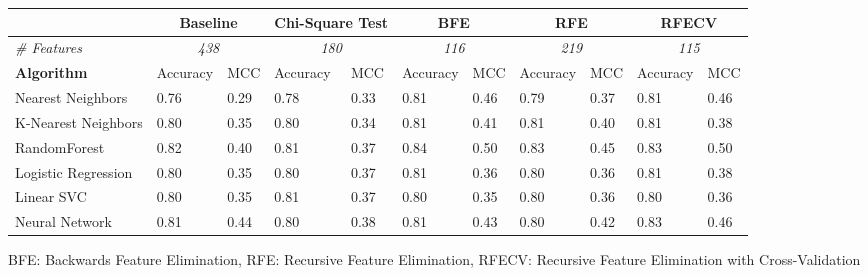 \begin{tabular}{l|ll|ll|ll|ll|ll}
& \multicolumn{2}{c|}{\textbf{Baseline}} & \multicolumn{2}{c|}{\textbf{Chi-Square Test}}  & \multicolumn{2}{c|}{\textbf{BFE}} & \multicolumn{2}{c|}{\textbf{RFE}}    & \multicolumn{2}{c}{\textbf{RFECV}} \\
\toprule
\textit{\# Features}& \multicolumn{2}{c|}{\textit{438}} & \multicolumn{2}{c|}{\textit{180}}  & \multicolumn{2}{c|}{\textit{116}} & \multicolumn{2}{c|}{\textit{219}}    & \multicolumn{2}{c}{\textit{115}} \\
\midrule
\textbf{Algorithm}      & Accuracy  & MCC   & Accuracy  & MCC   & Accuracy  & MCC   & Accuracy  & MCC   & Accuracy  & MCC \\
\midrule                       
Nearest Neighbors       & 0.76      & 0.29  & 0.78      & 0.33  & 0.81      & 0.46  & 0.79      & 0.37  & 0.81      & 0.46 \\
K-Nearest Neighbors     & 0.80      & 0.35  & 0.80      & 0.34  & 0.81      & 0.41  & 0.81      & 0.40  & 0.81      & 0.38 \\
RandomForest            & 0.82      & 0.40  & 0.81      & 0.37  & 0.84      & 0.50  & 0.83      & 0.45  & 0.83      & 0.50 \\
Logistic Regression     & 0.80      & 0.35  & 0.80      & 0.37  & 0.81      & 0.36  & 0.80      & 0.36  & 0.81      & 0.38 \\
Linear SVC              & 0.80      & 0.35  & 0.81      & 0.37  & 0.80      & 0.35  & 0.80      & 0.36  & 0.80      & 0.36 \\
Neural Network          & 0.81      & 0.44  & 0.80      & 0.38  & 0.81      & 0.43  & 0.80      & 0.42  & 0.83      & 0.46 \\
\bottomrule
\end{tabular}
\tiny{BFE: Backwards Feature Elimination, RFE: Recursive Feature Elimination, RFECV: Recursive Feature Elimination with Cross-Validation}